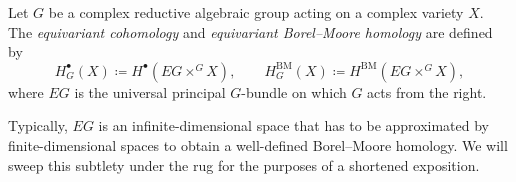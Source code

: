 \begin{definition}
	Let $G$ be a complex reductive algebraic group acting on a complex variety $X$. The \emph{equivariant cohomology} and \emph{equivariant Borel--Moore homology} are defined by
	\begin{equation}
		H_G^\bullet(X) \coloneq H^\bullet(EG \times^G X), \qquad H_G^\text{BM}(X) \coloneq H^\text{BM}(EG \times^G X),
	\end{equation}
	where $EG$ is the universal principal $G$-bundle on which $G$ acts from the right.
\end{definition}

\begin{remark}
	Typically, $EG$ is an infinite-dimensional space that has to be approximated by finite-dimensional spaces to obtain a well-defined Borel--Moore homology. We will sweep this subtlety under the rug for the purposes of a shortened exposition.
\end{remark}

